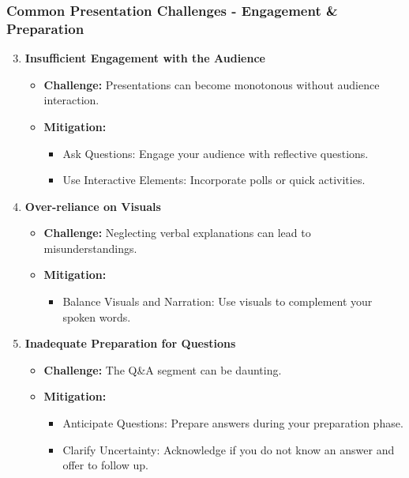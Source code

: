 \documentclass[aspectratio=169]{beamer}
\begin{document}
\begin{frame}[fragile]
  \frametitle{Common Presentation Challenges - Engagement & Preparation}
  \begin{enumerate}
    \setcounter{enumi}{2}
    \item \textbf{Insufficient Engagement with the Audience}
    \begin{itemize}
      \item \textbf{Challenge:} Presentations can become monotonous without audience interaction.
      \item \textbf{Mitigation:} 
      \begin{itemize}
        \item Ask Questions: Engage your audience with reflective questions.
        \item Use Interactive Elements: Incorporate polls or quick activities.
      \end{itemize}
    \end{itemize}

    \item \textbf{Over-reliance on Visuals}
    \begin{itemize}
      \item \textbf{Challenge:} Neglecting verbal explanations can lead to misunderstandings.
      \item \textbf{Mitigation:} 
      \begin{itemize}
        \item Balance Visuals and Narration: Use visuals to complement your spoken words.
      \end{itemize}
    \end{itemize}

    \item \textbf{Inadequate Preparation for Questions}
    \begin{itemize}
      \item \textbf{Challenge:} The Q\&A segment can be daunting.
      \item \textbf{Mitigation:} 
      \begin{itemize}
        \item Anticipate Questions: Prepare answers during your preparation phase.
        \item Clarify Uncertainty: Acknowledge if you do not know an answer and offer to follow up.
      \end{itemize}
    \end{itemize}
  \end{enumerate}
\end{frame}
\end{document}
